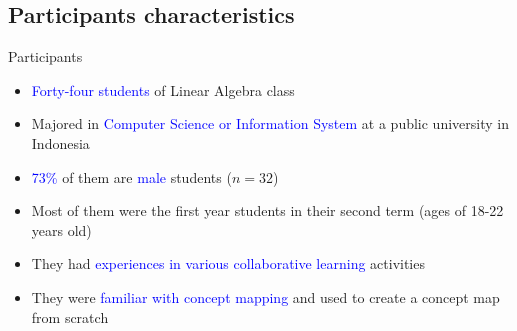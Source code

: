  


\subsection{Participants characteristics}




\begin{frame}{Participants}

\begin{itemize}
    \item <1-> \textcolor{blue}{Forty-four students} of Linear Algebra class
    \item <1-> Majored in \textcolor{blue}{Computer Science or Information System} at a public university in Indonesia
    \item <1> \textcolor{blue}{73\%} of them are \textcolor{blue}{male} students ($n = 32$)
    \item <1> Most of them were the first year students in their second term (ages of 18-22 years old)
    \item <2-> They had \textcolor{blue}{experiences in various collaborative learning} activities
    \item <2-> They were \textcolor{blue}{familiar with concept mapping} and used to create a concept map from scratch
\end{itemize}

\end{frame}
